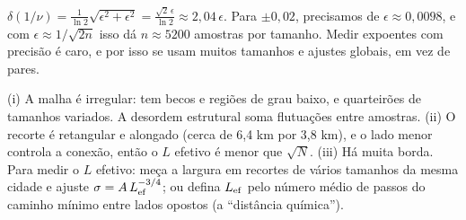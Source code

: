 \documentclass[11pt]{article}
\begin{document}
$\delta(1/\nu) = \frac{1}{\ln2}\sqrt{\epsilon^2+\epsilon^2} = \frac{\sqrt2\,\epsilon}{\ln2}\approx2{,}04\,\epsilon$. Para $\pm0{,}02$, precisamos de $\epsilon\approx0{,}0098$, e com $\epsilon\approx1/\sqrt{2n}$ isso dá $n\approx5200$ amostras por tamanho. Medir expoentes com precisão é caro, e por isso se usam muitos tamanhos e ajustes globais, em vez de pares.

(i) A malha é irregular: tem becos e regiões de grau baixo, e quarteirões de tamanhos variados. A desordem estrutural soma flutuações entre amostras. (ii) O recorte é retangular e alongado (cerca de 6,4 km por 3,8 km), e o lado menor controla a conexão, então o $L$ efetivo é menor que $\sqrt N$. (iii) Há muita borda. Para medir o $L$ efetivo: meça a largura em recortes de vários tamanhos da mesma cidade e ajuste $\sigma = A\,L_{\rm ef}^{-3/4}$; ou defina $L_{\rm ef}$ pelo número médio de passos do caminho mínimo entre lados opostos (a ``distância química'').
\end{document}
